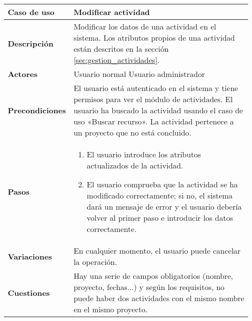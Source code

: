 \begin{tabular}{|p{1.25in}|p{3.65in}|}\hline
\textbf{Caso de uso} & \textbf{Modificar actividad}\\\hline\hline
\textbf{Descripción} & Modificar los datos de una actividad en el sistema. Los
atributos propios de una actividad están descritos en la sección
\ref{sec:gestion_actividades}. \\\hline
\textbf{Actores} & Usuario normal \newline Usuario administrador\\\hline
\textbf{Precondiciones} & El usuario está autenticado en el sistema y
tiene permisos para ver el módulo de actividades. \newline El usuario ha
buscado la actividad usando el caso de uso «Buscar recurso». \newline La
actividad pertenece a un proyecto que no está concluido.\\\hline
\textbf{Pasos} & 
  \begin{enumerate}
   \item El usuario introduce los atributos actualizados de la actividad.
   \item El usuario comprueba que la actividad se ha modificado correctamente;
si no, el sistema dará un mensaje de error y el usuario debería volver al primer
paso e introducir los datos correctamente.
  \end{enumerate}
\\\hline
\textbf{Variaciones} & En cualquier momento, el usuario puede cancelar
la operación.\\\hline
\textbf{Cuestiones} & Hay una serie de campos obligatorios (nombre,
proyecto, fechas...) y según los requisitos, no puede haber dos actividades
con el mismo nombre en el mismo proyecto.\\\hline
\end{tabular}

